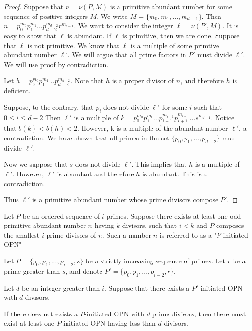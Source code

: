\documentclass[../paper.tex]{subfiles}
\begin{document}
\begin{proof}
Suppose that $n = \nu(P,M)$ is a primitive abundant number for
some sequence of positive integers $M$. We write $M = \{ m_0,
m_1, ..., m_{d-1}\}$. Then $n = p_0^{m_0} p_1^{m_1} ... 
p_{d-2}^{m_{d-2}} r^{m_{d-1}}$. We want to consider the integer 
$\ell = \nu(P', M)$. It is easy to show that $\ell$ is abundant. 
If $\ell$ is primitive, then we are done. Suppose that $\ell$ is not
primitive. We know that $\ell$ is a multiple of some primtive
abundant number $\ell'$. We will argue that all prime factors in
$P'$ must divide $\ell'$. We will use proof by contradiction. 

Let $h = p_0^{m_0} p_1^{m_1} ... p_{d-2}^{m_{d-2}}$. Note that $h$
is a proper divisor of $n$, and therefore $h$ is deficient.

Suppose, to the contrary, that $p_i$ does not divide $\ell'$ for
some $i$ such that $0 \leq i \leq d - 2$
Then $\ell'$ is a multiple of $k = p_0^{m_0}
p_1^{m_1} ... p_{i-1}^{m_{i-1}} p_{i+1}^{m_{i+1}} ... 
s^{m_{d-1}}$. Notice that $b(k) < b(h) < 2$. However, k is a 
multiple of the abundant number $\ell'$, a contradiction. We have
shown that all primes in the set $\{p_0, p_1, ..., p_{d-2}\}$
must divide $\ell'$.  

Now we suppose that $s$ does not divide $\ell'$. This implies
that $h$ is a multiple of $\ell'$. However, $\ell'$ is abundant 
and therefore $h$ is abundant. This is a contradiction.

Thus $\ell'$ is a primitive abundant number whose prime divisors
compose $P'$.
\end{proof}


Let $P$ be an
ordered sequence of $i$ primes. Suppose there exists at least one
odd primitive abundant number $n$ having $k$ divisors, such that $i
< k$ and $P$ composes the smallest $i$ prime divisors of $n$.
Such a number $n$ is referred to as a "$P$-initiated OPN"

\begin{theorem}
\label{Divisibility}
Let $P = \{p_0, p_1, ..., p_{i-2}, s\}$ be a strictly increasing 
sequence of primes. Let $r$ be a prime greater than $s$, and 
denote $P' = \{p_0, p_1, ..., p_{i-2}, r\}$.

Let $d$ be an integer greater than $i$. 
Suppose that there exists a $P'$-initiated OPN with $d$ divisors.

If there does not exists a $P$-initiated OPN with $d$ prime
divisors, then there must exist at least one  
$P$-initiated OPN having less than $d$ divisors.

\end{theorem}
\end{document}
